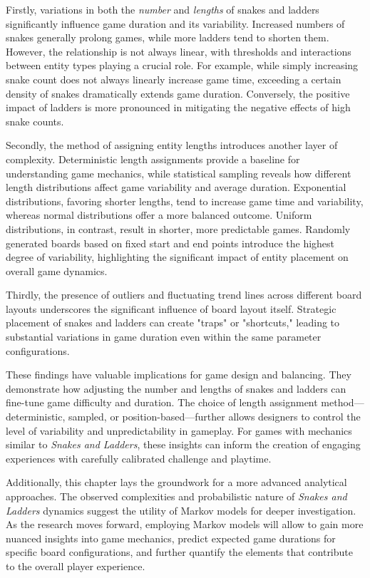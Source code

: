 Firstly, variations in both the \textit{number} and \textit{lengths} of snakes and ladders significantly influence game duration and its variability. Increased numbers of snakes generally prolong games, while more ladders tend to shorten them. However, the relationship is not always linear, with thresholds and interactions between entity types playing a crucial role. For example, while simply increasing snake count does not always linearly increase game time, exceeding a certain density of snakes dramatically extends game duration. Conversely, the positive impact of ladders is more pronounced in mitigating the negative effects of high snake counts.

Secondly, the method of assigning entity lengths introduces another layer of complexity. Deterministic length assignments provide a baseline for understanding game mechanics, while statistical sampling reveals how different length distributions affect game variability and average duration. Exponential distributions, favoring shorter lengths, tend to increase game time and variability, whereas normal distributions offer a more balanced outcome. Uniform distributions, in contrast, result in shorter, more predictable games. Randomly generated boards based on fixed start and end points introduce the highest degree of variability, highlighting the significant impact of entity placement on overall game dynamics.

Thirdly, the presence of outliers and fluctuating trend lines across different board layouts underscores the significant influence of board layout itself. Strategic placement of snakes and ladders can create "traps" or "shortcuts," leading to substantial variations in game duration even within the same parameter configurations.

These findings have valuable implications for game design and balancing. They demonstrate how adjusting the number and lengths of snakes and ladders can fine-tune game difficulty and duration. The choice of length assignment method—deterministic, sampled, or position-based—further allows designers to control the level of variability and unpredictability in gameplay. For games with mechanics similar to \textit{Snakes and Ladders}, these insights can inform the creation of engaging experiences with carefully calibrated challenge and playtime.

Additionally, this chapter lays the groundwork for a more advanced analytical approaches. The observed complexities and probabilistic nature of \textit{Snakes and Ladders} dynamics suggest the utility of Markov models for deeper investigation. As the research moves forward, employing Markov models will allow to gain more nuanced insights into game mechanics, predict expected game durations for specific board configurations, and further quantify the elements that contribute to the overall player experience. 
